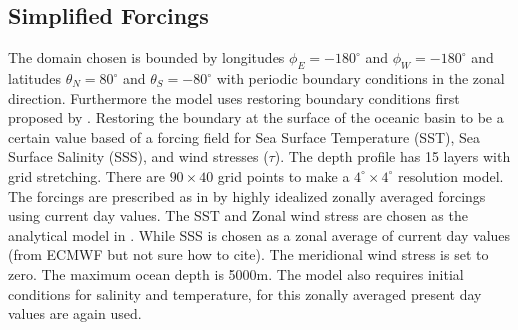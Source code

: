
\subsection{Simplified Forcings}
The domain chosen is bounded by longitudes $\phi_E=-180^{\circ}$ and $\phi_W=-180^{\circ}$ and latitudes $\theta_N=80^{\circ}$ and $\theta_S=-80^{\circ}$ with periodic boundary conditions in the zonal direction.
Furthermore the model uses restoring boundary conditions first proposed by \cite{haney1971surface}. Restoring the boundary at the surface of the oceanic basin to be a certain value based of a forcing field for Sea Surface Temperature (SST), Sea Surface Salinity (SSS), and wind stresses ($\tau$).
 The depth profile has 15 layers with grid stretching. There are $90 \times 40$ grid points to make a $4^{\circ} \times 4^{\circ}$ resolution model. The forcings are prescribed as in \cite{Mulder2017Jul} by highly idealized zonally averaged forcings using current day values. The SST and Zonal wind stress are chosen as the analytical model in \cite{bryan1987parameter}. While SSS is chosen as a zonal average of current day values (from ECMWF but not sure how to cite). The meridional wind stress is set to zero. The maximum ocean depth is 5000m. The model also requires initial conditions for salinity and temperature, for this zonally averaged present day values are again used.